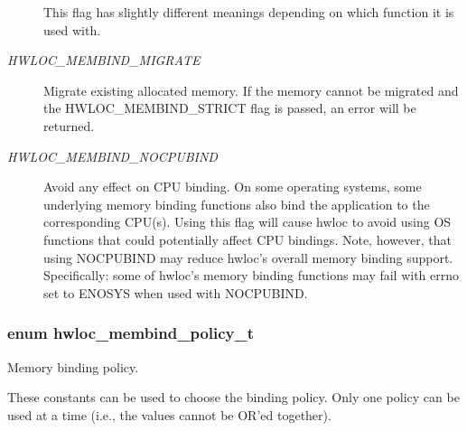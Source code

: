 \begin{Desc}
\begin{description}
This flag has slightly different meanings depending on which function it is used with. \item[{\em 
\hypertarget{a00050_ggab00475fd98815bf4fb9aaf752030e7d2aa6e49e54f52827cb143cc869cfd748af}{
HWLOC\_\-MEMBIND\_\-MIGRATE}
\label{a00050_ggab00475fd98815bf4fb9aaf752030e7d2aa6e49e54f52827cb143cc869cfd748af}
}]Migrate existing allocated memory. If the memory cannot be migrated and the HWLOC\_\-MEMBIND\_\-STRICT flag is passed, an error will be returned. \item[{\em 
\hypertarget{a00050_ggab00475fd98815bf4fb9aaf752030e7d2aad6b9eaf2ee324ca58dc8f58094b9997}{
HWLOC\_\-MEMBIND\_\-NOCPUBIND}
\label{a00050_ggab00475fd98815bf4fb9aaf752030e7d2aad6b9eaf2ee324ca58dc8f58094b9997}
}]Avoid any effect on CPU binding. On some operating systems, some underlying memory binding functions also bind the application to the corresponding CPU(s). Using this flag will cause hwloc to avoid using OS functions that could potentially affect CPU bindings. Note, however, that using NOCPUBIND may reduce hwloc's overall memory binding support. Specifically: some of hwloc's memory binding functions may fail with errno set to ENOSYS when used with NOCPUBIND. \end{description}
\end{Desc}

\hypertarget{a00050_gac9764f79505775d06407b40f5e4661e8}{
\subsubsection[{hwloc\_\-membind\_\-policy\_\-t}]{\setlength{\rightskip}{0pt plus 5cm}enum {\bf hwloc\_\-membind\_\-policy\_\-t}}}
\label{a00050_gac9764f79505775d06407b40f5e4661e8}


Memory binding policy. 

These constants can be used to choose the binding policy. Only one policy can be used at a time (i.e., the values cannot be OR'ed together).

